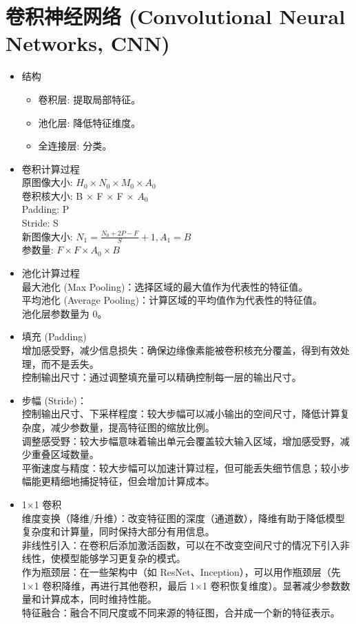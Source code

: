 \documentclass[
12pt, %
a4paper, 
oneside, %
headinclude,footinclude, %
]{scrartcl}
\begin{document}
\section{卷积神经网络 (Convolutional Neural Networks, CNN)}
\begin{itemize}
    \item 结构
    \begin{itemize}
        \item 卷积层: 提取局部特征。
        \item 池化层: 降低特征维度。
        \item 全连接层: 分类。
    \end{itemize}
    
    \item 卷积计算过程\\
    原图像大小: $H_0 \times N_0 \times M_0 \times A_0$\\
    卷积核大小: B × F × F × $A_0$\\
    Padding: P\\
    Stride: S\\
    新图像大小: $N_1 = \frac{N_0+2P-F}{S}+1, A_1 = B$\\
    参数量: $F \times F \times A_0 \times B$
    
    \item 池化计算过程\\
    最大池化 (Max Pooling)：选择区域的最大值作为代表性的特征值。\\
    平均池化 (Average Pooling)：计算区域的平均值作为代表性的特征值。\\
    池化层参数量为 0。
    
    \item 填充 (Padding)\\
    增加感受野，减少信息损失：确保边缘像素能被卷积核充分覆盖，得到有效处理，而不是丢失。\\
    控制输出尺寸：通过调整填充量可以精确控制每一层的输出尺寸。
    
    \item 步幅 (Stride)：\\
    控制输出尺寸、下采样程度：较大步幅可以减小输出的空间尺寸，降低计算复杂度，减少参数量，提高特征图的缩放比例。\\
    调整感受野：较大步幅意味着输出单元会覆盖较大输入区域，增加感受野，减少重叠区域数量。\\
    平衡速度与精度：较大步幅可以加速计算过程，但可能丢失细节信息；较小步幅能更精细地捕捉特征，但会增加计算成本。
    
    \item 1×1 卷积\\
    维度变换（降维/升维）：改变特征图的深度（通道数），降维有助于降低模型复杂度和计算量，同时保持大部分有用信息。\\
    非线性引入：在卷积后添加激活函数，可以在不改变空间尺寸的情况下引入非线性，使模型能够学习更复杂的模式。\\
    作为瓶颈层：在一些架构中（如 ResNet、Inception），可以用作瓶颈层（先 1×1 卷积降维，再进行其他卷积，最后 1×1 卷积恢复维度）。显著减少参数数量和计算成本，同时维持性能。\\
    特征融合：融合不同尺度或不同来源的特征图，合并成一个新的特征表示。
\end{itemize}
\end{document}
